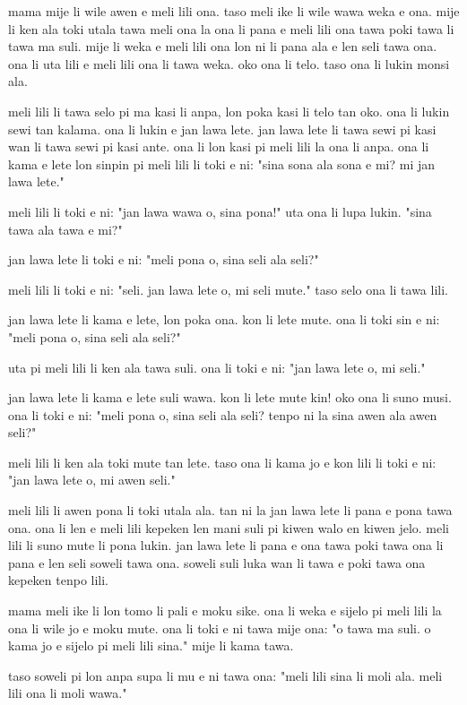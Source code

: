 mama mije li wile awen e meli lili ona.
taso meli ike li wile wawa weka e ona.
mije li ken ala toki utala tawa meli ona la ona li pana e meli lili ona tawa poki tawa li tawa ma suli.
mije li weka e meli lili ona lon ni li pana ala e len seli tawa ona.
ona li uta lili e meli lili ona li tawa weka.
oko ona li telo.
taso ona li lukin monsi ala.

meli lili li tawa selo pi ma kasi li anpa, lon poka kasi li telo tan oko.
ona li lukin sewi tan kalama.
ona li lukin e jan lawa lete.
jan lawa lete li tawa sewi pi kasi wan li tawa sewi pi kasi ante.
ona li lon kasi pi meli lili la ona li anpa.
ona li kama e lete lon sinpin pi meli lili li toki e ni:
"sina sona ala sona e mi?
mi jan lawa lete."

meli lili li toki e ni:
"jan lawa wawa o, sina pona!"
uta ona li lupa lukin.
"sina tawa ala tawa e mi?"

jan lawa lete li toki e ni:
"meli pona o, sina seli ala seli?"

meli lili li toki e ni:
"seli.
jan lawa lete o, mi seli mute."
taso selo ona li tawa lili.

jan lawa lete li kama e lete, lon poka ona.
kon li lete mute.
ona li toki sin e ni:
"meli pona o, sina seli ala seli?"

uta pi meli lili li ken ala tawa suli.
ona li toki e ni:
"jan lawa lete o, mi seli."

jan lawa lete li kama e lete suli wawa.
kon li lete mute kin!
oko ona li suno musi.
ona li toki e ni:
"meli pona o, sina seli ala seli?
tenpo ni la sina awen ala awen seli?"

meli lili li ken ala toki mute tan lete.
taso ona li kama jo e kon lili li toki e ni:
"jan lawa lete o, mi awen seli."

meli lili li awen pona li toki utala ala.
tan ni la jan lawa lete li pana e pona tawa ona.
ona li len e meli lili kepeken len mani suli pi kiwen walo en kiwen jelo.
meli lili li suno mute li pona lukin.
jan lawa lete li pana e ona tawa poki tawa ona li pana e len seli soweli tawa ona.
soweli suli luka wan li tawa e poki tawa ona kepeken tenpo lili.

mama meli ike li lon tomo li pali e moku sike.
ona li weka e sijelo pi meli lili la ona li wile jo e moku mute.
ona li toki e ni tawa mije ona:
"o tawa ma suli.
o kama jo e sijelo pi meli lili sina."
mije li kama tawa.

taso soweli pi lon anpa supa li mu e ni tawa ona:
"meli lili sina li moli ala.
meli lili ona li moli wawa."

